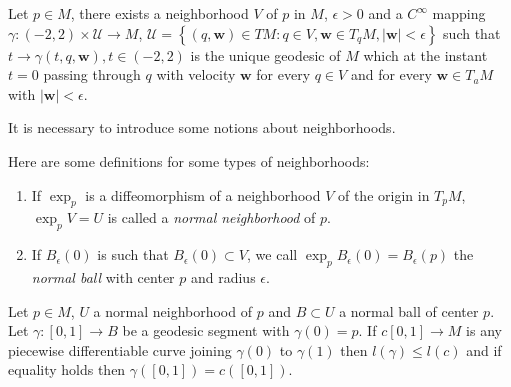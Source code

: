 \begin{corollary}\label{crc-1}
  Let $p\in M$, there exists a neighborhood $V$ of $p$ in $M$, $\epsilon >0$ and a $C^\infty$ mapping $\gamma:(-2,2)\times \mathcal{U}\to M$, $\mathcal{U}=\left\{(q,\mathbf{w})\in TM:q\in V,\mathbf{w}\in T_qM,|\mathbf{w}|<\epsilon \right\} $ such that $t\to \gamma(t,q,\mathbf{w}),t\in(-2,2)$ is the unique geodesic of $M$ which at the instant $t=0$ passing through  $q$ with velocity $\mathbf{w}$ for every $q\in V$ and for every $\mathbf{w}\in T_aM$ with $|\mathbf{w}|<\epsilon $.
\end{corollary}

It is necessary to introduce some notions about neighborhoods.
\begin{definition}
  Here are some definitions for some types of neighborhoods:
  \begin{enumerate}
    \item If $\exp_p$ is a diffeomorphism of a neighborhood $V$ of the origin in $T_pM$, $\exp_pV=U$ is called a \textit{normal neighborhood} of $p$.
    \item If $B_\epsilon (0)$ is such that $B_{\epsilon }(0)\subset V$, we call $\exp_p B_\epsilon (0)=B_\epsilon (p)$ the \textit{normal ball} with center $p$ and radius $\epsilon $.
  \end{enumerate}
\end{definition}
\begin{proposition}
  Let $p\in M$, $U$ a normal neighborhood of $p$ and $B\subset U$ a normal ball of center $p$. Let $\gamma:[0,1]\to B$ be a geodesic segment with $\gamma(0)=p$. If $c[0,1]\to M$ is any piecewise differentiable curve joining $\gamma(0)$ to $\gamma(1)$ then $l(\gamma)\le l(c)$ and if equality holds then $\gamma\left( [0,1] \right) =c\left( [0,1] \right) $.
\end{proposition}

